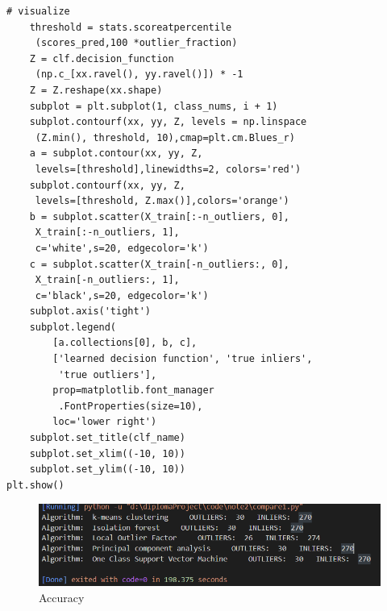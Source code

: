 \documentclass[UTF8]{ctexart}
\begin{document}
\begin{lstlisting}[style=stylePy]
    # visualize
    threshold = stats.scoreatpercentile
     (scores_pred,100 *outlier_fraction)
    Z = clf.decision_function
     (np.c_[xx.ravel(), yy.ravel()]) * -1
    Z = Z.reshape(xx.shape)
    subplot = plt.subplot(1, class_nums, i + 1)
    subplot.contourf(xx, yy, Z, levels = np.linspace
     (Z.min(), threshold, 10),cmap=plt.cm.Blues_r)
    a = subplot.contour(xx, yy, Z,
     levels=[threshold],linewidths=2, colors='red')
    subplot.contourf(xx, yy, Z,
     levels=[threshold, Z.max()],colors='orange')
    b = subplot.scatter(X_train[:-n_outliers, 0],
     X_train[:-n_outliers, 1],
     c='white',s=20, edgecolor='k') 
    c = subplot.scatter(X_train[-n_outliers:, 0],
     X_train[-n_outliers:, 1],
     c='black',s=20, edgecolor='k')
    subplot.axis('tight')
    subplot.legend(
        [a.collections[0], b, c],
        ['learned decision function', 'true inliers',
         'true outliers'],
        prop=matplotlib.font_manager
         .FontProperties(size=10),
        loc='lower right')
    subplot.set_title(clf_name)
    subplot.set_xlim((-10, 10))
    subplot.set_ylim((-10, 10))
plt.show() 
\end{lstlisting}

\begin{figure}[H] %
\centering %
\includegraphics[width=1.1\textwidth]{plt_t1_5.png} %
\caption{Accuracy} %
\end{figure}
\end{document}
